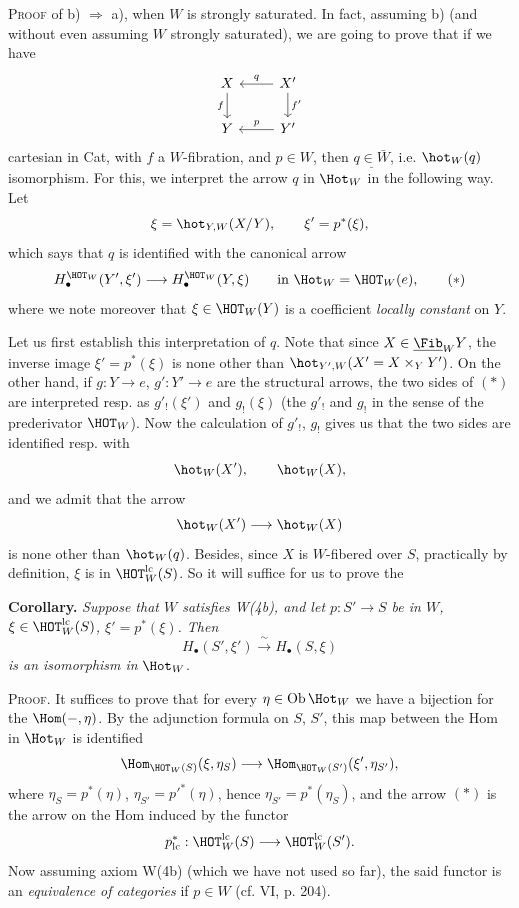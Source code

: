 \textsc{Proof} of b) $\Longrightarrow$ a), when $W$ is strongly saturated. In fact, assuming b) (and without even assuming $W$ strongly saturated), we are going to prove that if we have
\[
\begin{tikzcd}
X & X' \arrow[l,"q"'] \arrow[d,"f'"] \\
Y \arrow[from=u,"f"'] & Y' \arrow[l,"p"']
\end{tikzcd}
\]
cartesian in Cat, with
$f$ a $W$-fibration, and $p \in W$, then $\underline{q \in \bar{W}}$, i.e. $\hot_W(q)$ isomorphism. For this, we interpret the arrow $q$ in $\Hot_W$ in the following way. Let
\[
\xi = \hot_{Y,W}(X/Y), \qquad \xi' = p^*(\xi),
\]
which says that $q$ is identified with the canonical arrow
\[
H_\bullet^{\HOT_W}(Y',\xi') \longrightarrow H_\bullet^{\HOT_W}(Y,\xi) \qquad \text{in } \Hot_W = \HOT_W(e), \tag*{$(*)$}
\]
where we note moreover that $\xi \in \HOT_W(Y)$ is a coefficient \textit{locally constant} on $Y$.

Let us first establish this interpretation of $q$. Note that since $X \in \underline{\Fib}_W Y$, the inverse image $\xi' = p^*(\xi)$ is none other than $\hot_{Y',W}(X' = X \times_Y Y')$. On the other hand, if $g : Y \longrightarrow e$, $g' : Y' \longrightarrow e$ are the structural arrows, the two sides of $(*)$ are interpreted resp. as $g'_!(\xi')$ and $g_!(\xi)$ (the $g'_!$ and $g_!$ in the sense of the prederivator $\HOT_W$). Now the calculation of $g'_!$, $g_!$ gives us that the two sides are identified resp. with
\[
\hot_W(X'), \qquad \hot_W(X),
\]
and we admit that the arrow
\[
\hot_W(X') \longrightarrow \hot_W(X)
\]
is none other than $\hot_W(q)$. Besides, since $X$ is $W$-fibered over $S$, practically by definition, $\xi$ is in $\HOT^{\mathrm{lc}}_W(S)$. So it will suffice for us to prove the


\textbf{Corollary.} \textit{Suppose that $W$ satisfies W(4b), and let $p : S' \longrightarrow S$ be in $W$, $\xi \in \HOT^{\mathrm{lc}}_W(S)$, $\xi' = p^*(\xi)$. Then}
\[
H_\bullet(S',\xi') \xrightarrow{\ \sim\ } H_\bullet(S,\xi)
\]
\textit{is an isomorphism in} $\Hot_W$.

\textsc{Proof}. It suffices to prove that for every $\eta \in \mathrm{Ob}\,\Hot_W$ we have a bijection for the $\Hom(-,\eta)$. By the adjunction formula on $S$, $S'$, this map between the Hom in $\Hot_W$ is identified 
\[
\Hom_{\HOT_W(S)}(\xi,\eta_S) \longrightarrow \Hom_{\HOT_W(S')}(\xi',\eta_{S'}),
\]
where $\eta_S = p^*(\eta)$, $\eta_{S'} = p'^*(\eta)$, hence $\eta_{S'} = p^*(\eta_S)$, and the arrow $(*)$ is the arrow on the Hom induced by the functor
\[
p^*_{\mathrm{lc}} : \HOT^{\mathrm{lc}}_W(S) \longrightarrow \HOT^{\mathrm{lc}}_W(S').
\]
Now assuming axiom W(4b) (which we have not used so far), the said functor is an \textit{equivalence of categories} if $p \in W$ (cf. VI, p. 204).

